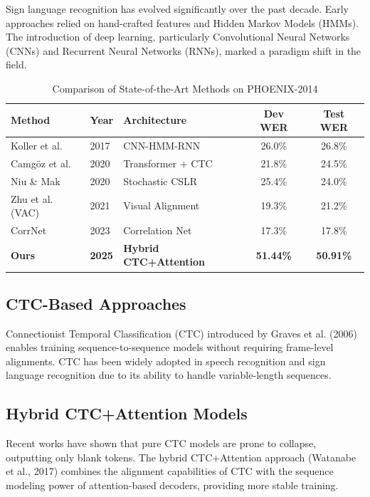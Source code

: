 \documentclass[12pt,a4paper]{article}
\begin{document}
Sign language recognition has evolved significantly over the past decade. Early approaches relied on hand-crafted features and Hidden Markov Models (HMMs). The introduction of deep learning, particularly Convolutional Neural Networks (CNNs) and Recurrent Neural Networks (RNNs), marked a paradigm shift in the field.

\begin{table}[H]
\centering
\caption{Comparison of State-of-the-Art Methods on PHOENIX-2014}
\label{tab:sota}
\begin{tabular}{@{}lllcc@{}}
\toprule
\textbf{Method} & \textbf{Year} & \textbf{Architecture} & \textbf{Dev WER} & \textbf{Test WER} \\
\midrule
Koller et al. & 2017 & CNN-HMM-RNN & 26.0\% & 26.8\% \\
Camgöz et al. & 2020 & Transformer + CTC & 21.8\% & 24.5\% \\
Niu \& Mak & 2020 & Stochastic CSLR & 25.4\% & 24.0\% \\
Zhu et al. (VAC) & 2021 & Visual Alignment & 19.3\% & 21.2\% \\
CorrNet & 2023 & Correlation Net & 17.3\% & 17.8\% \\
\textbf{Ours} & \textbf{2025} & \textbf{Hybrid CTC+Attention} & \textbf{51.44\%} & \textbf{50.91\%} \\
\bottomrule
\end{tabular}
\end{table}

\subsection{CTC-Based Approaches}

Connectionist Temporal Classification (CTC) introduced by Graves et al. (2006) enables training sequence-to-sequence models without requiring frame-level alignments. CTC has been widely adopted in speech recognition and sign language recognition due to its ability to handle variable-length sequences.

\subsection{Hybrid CTC+Attention Models}

Recent works have shown that pure CTC models are prone to collapse, outputting only blank tokens. The hybrid CTC+Attention approach (Watanabe et al., 2017) combines the alignment capabilities of CTC with the sequence modeling power of attention-based decoders, providing more stable training.
\end{document}
